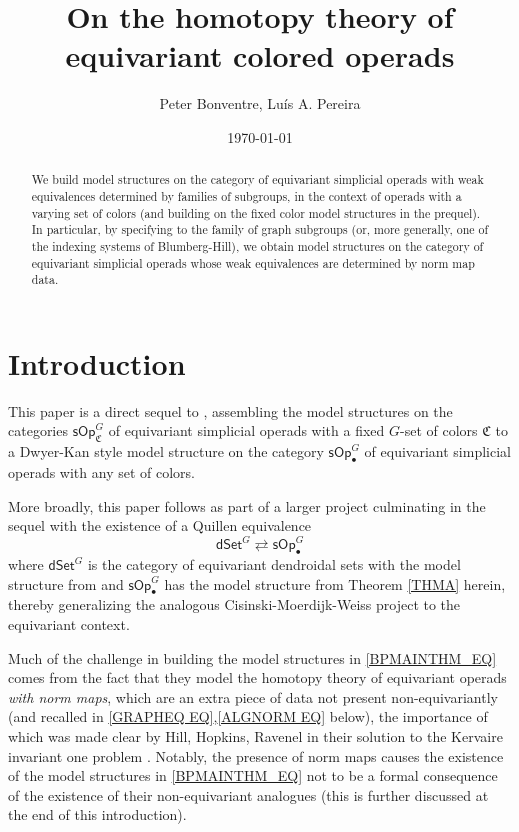 \documentclass[a4paper,10pt
 ,final
]{article}%
\title{On the homotopy theory of equivariant colored operads}
\author{Peter Bonventre, Lu\'is A. Pereira}%
\date{\today}
\numberwithin{equation}{section}
\numberwithin{figure}{section}
\theoremstyle{definition} %
\newcommand{\sOp}{\ensuremath{\mathsf{sOp}}}%
\newcommand{\1}{\ensuremath{\mathbbm 1}}%
\begin{document}
\maketitle

\begin{abstract}
	We build model structures 
	on the category of equivariant simplicial operads
	with weak equivalences determined by families of subgroups,
	in the context of operads with a varying set of colors
	(and building on the fixed color model structures in the prequel).
	In particular, by specifying to the family of graph subgroups 
	(or, more generally, one of the indexing systems of Blumberg-Hill),
	we obtain model structures on the category of equivariant simplicial operads
	whose weak equivalences are determined by norm map data.
\end{abstract}



\tableofcontents







\section{Introduction}

This paper is a direct sequel to \cite{BP_FCOP},
assembling the model structures on the categories
$\sOp_{\mathfrak C}^G$
of equivariant simplicial operads with a fixed 
$G$-set of colors $\mathfrak C$
\cite[Thm. \ref{OC-THMI}]{BP_FCOP}
to a Dwyer-Kan style model structure on the category
$\sOp_\bullet^G$
of equivariant simplicial operads with any set of colors.


More broadly, this paper follows
\cite{Per18,BP_geo,BP20,BP_FCOP}
as part of a larger project culminating in 
the sequel \cite{BP_TAS}
with the existence of a Quillen equivalence
\begin{equation}\label{BPMAINTHM_EQ}
\mathsf{dSet}^G \rightleftarrows \mathsf{sOp}_{\bullet}^G
\end{equation}
where $\mathsf{dSet}^G$ is the category
of equivariant dendroidal sets with the model structure
from \cite{Per18}
and 
$\mathsf{sOp}_{\bullet}^G$
has the model structure from 
Theorem \ref{THMA} herein,
thereby generalizing the 
analogous Cisinski-Moerdijk-Weiss project
\cite{MW09,CM11,CM13a,CM13b} to the equivariant context.


Much of the challenge in building the model structures 
in \eqref{BPMAINTHM_EQ} 
comes from the fact that they model the homotopy theory of
equivariant operads \emph{with norm maps},
which are an extra piece of data
not present non-equivariantly
(and recalled in \eqref{GRAPHEQ EQ},\eqref{ALGNORM EQ} below),
the importance of which was made clear by
Hill, Hopkins, Ravenel 
in their solution to the Kervaire invariant one problem \cite{HHR16}.
Notably, the presence of norm maps causes the existence
of the model structures in \eqref{BPMAINTHM_EQ}
not to be a formal consequence of the 
existence of their non-equivariant analogues
(this is further discussed at the end of this introduction).
\end{document}
